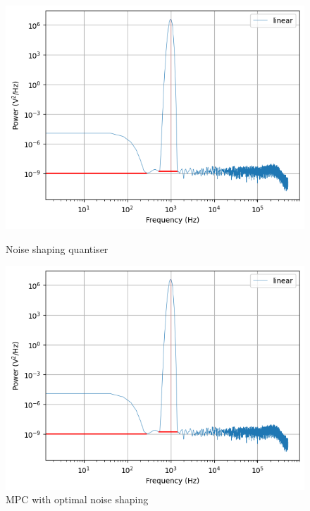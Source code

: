 \documentclass[a4paper]{article}
\begin{document}
\begin{figure}[!h]
	\centering
	\begin{minipage}{0.5\linewidth}
		\centering
		\includegraphics[scale = 0.6]{psd_plots/nsd.png}
		\caption{Noise shaping quantiser}
        \label{fig:nsd_psd}
	\end{minipage}
	\hfil
	\begin{minipage}{0.45\linewidth}
		\centering
		\includegraphics[scale = 0.6]{psd_plots/mpc.png}
		\caption{MPC with optimal noise shaping}
   \label{fig:mpc_psd}
	\end{minipage}
\end{figure}
\end{document}
